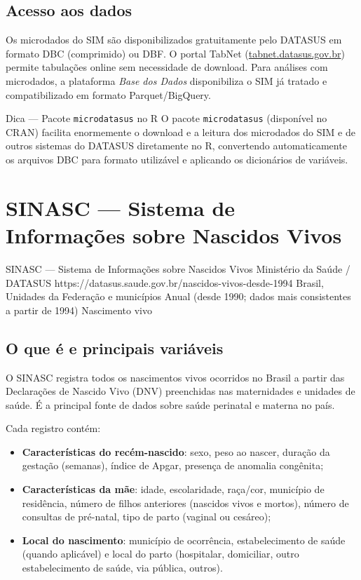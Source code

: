 \subsection{Acesso aos dados}

Os microdados do SIM são disponibilizados gratuitamente pelo DATASUS em formato DBC (comprimido) ou DBF. O portal TabNet (\url{tabnet.datasus.gov.br}) permite tabulações online sem necessidade de download. Para análises com microdados, a plataforma \textit{Base dos Dados} disponibiliza o SIM já tratado e compatibilizado em formato Parquet/BigQuery.

\begin{boxdica}{Dica --- Pacote \texttt{microdatasus} no R}
O pacote \texttt{microdatasus} (disponível no CRAN) facilita enormemente o download e a leitura dos microdados do SIM e de outros sistemas do DATASUS diretamente no R, convertendo automaticamente os arquivos DBC para formato utilizável e aplicando os dicionários de variáveis.
\end{boxdica}

\section{SINASC --- Sistema de Informações sobre Nascidos Vivos}

\ficharapida
  {SINASC --- Sistema de Informações sobre Nascidos Vivos}
  {Ministério da Saúde / DATASUS}
  {https://datasus.saude.gov.br/nascidos-vivos-desde-1994}
  {Brasil, Unidades da Federação e municípios}
  {Anual (desde 1990; dados mais consistentes a partir de 1994)}
  {Nascimento vivo}

\subsection{O que é e principais variáveis}

O SINASC registra todos os nascimentos vivos ocorridos no Brasil a partir das Declarações de Nascido Vivo (DNV) preenchidas nas maternidades e unidades de saúde. É a principal fonte de dados sobre saúde perinatal e materna no país.

Cada registro contém:

\begin{itemize}
  \item \textbf{Características do recém-nascido}: sexo, peso ao nascer, duração da gestação (semanas), índice de Apgar, presença de anomalia congênita;
  \item \textbf{Características da mãe}: idade, escolaridade, raça/cor, município de residência, número de filhos anteriores (nascidos vivos e mortos), número de consultas de pré-natal, tipo de parto (vaginal ou cesáreo);
  \item \textbf{Local do nascimento}: município de ocorrência, estabelecimento de saúde (quando aplicável) e local do parto (hospitalar, domiciliar, outro estabelecimento de saúde, via pública, outros).
\end{itemize}

